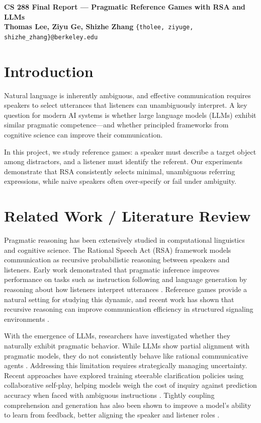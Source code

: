 \documentclass[10pt]{article}
\begin{document}
\begin{center}
    \textbf{\Large CS 288 Final Report --- Pragmatic Reference Games with RSA and LLMs} \\[2pt]
    \textbf{Thomas Lee, Ziyu Ge, Shizhe Zhang} \quad
    \texttt{\{tholee, ziyuge, shizhe\_zhang\}@berkeley.edu}
    \vspace{-0.1cm}
\end{center}

\section{Introduction}
Natural language is inherently ambiguous, and effective communication requires speakers to select utterances that
listeners can unambiguously interpret. A key question for modern AI systems is whether
large language models (LLMs) exhibit similar pragmatic competence—and whether principled frameworks from cognitive
science can improve their communication.

In this project, we study reference games: a speaker must describe a target object among distractors, and a listener must
identify the referent. Our experiments demonstrate that RSA consistently selects minimal, unambiguous referring expressions, while
naive speakers often over-specify or fail under ambiguity.

\section{Related Work / Literature Review}

\indent Pragmatic reasoning has been extensively studied in computational linguistics and cognitive science. The Rational Speech Act (RSA) framework models communication as recursive probabilistic reasoning between speakers and listeners. Early work demonstrated that pragmatic inference improves performance on tasks such as instruction following and language generation by reasoning about how listeners interpret utterances \cite{fried2017pragmatic, cohn2018pragmatically}. Reference games provide a natural setting for studying this dynamic, and recent work has shown that recursive reasoning can improve communication efficiency in structured signaling environments \cite{carlsson2023structured}.

With the emergence of LLMs, researchers have investigated whether they naturally exhibit pragmatic behavior. While LLMs show partial alignment with pragmatic models, they do not consistently behave like rational communicative agents \cite{jian2024llmpragmatic}. Addressing this limitation requires strategically managing uncertainty. Recent approaches have explored training steerable clarification policies using collaborative self-play, helping models weigh the cost of inquiry against prediction accuracy when faced with ambiguous instructions \cite{berant2025steerable}. Tightly coupling comprehension and generation has also been shown to improve a model's ability to learn from feedback, better aligning the speaker and listener roles \cite{gul2024cogen}.
\end{document}
